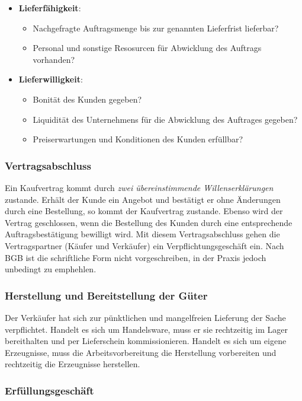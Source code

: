 \documentclass[a4paper, 12pt]{report}
\begin{document}
\begin{multicols}{2}
\begin{itemize}
    \item \textbf{Lieferfähigkeit}:
    \begin{itemize}
	\item Nachgefragte Auftragsmenge bis zur genannten Lieferfrist
	    lieferbar?
	\item Personal und sonstige Resosurcen für Abwicklung des Auftrags
	    vorhanden?
    \end{itemize}
    \item \textbf{Lieferwilligkeit}:
    \begin{itemize}
	\item Bonität des Kunden gegeben?
	\item Liquidität des Unternehmens für die Abwicklung des Auftrages
	    gegeben?
	\item Preiserwartungen und Konditionen des Kunden erfüllbar?
    \end{itemize}
\end{itemize}

\subsubsection{Vertragsabschluss}

Ein Kaufvertrag kommt durch \emph{zwei übereinstimmende Willenserklärungen}
zustande. Erhält der Kunde ein Angebot und bestätigt er ohne Änderungen durch
eine Bestellung, so kommt der Kaufvertrag zustande. Ebenso wird der Vertrag
geschlossen, wenn die Bestellung des Kunden durch eine entsprechende
Auftragsbestätigung bewilligt wird. Mit diesem Vertragsabschluss gehen die
Vertragspartner (Käufer und Verkäufer) ein Verpflichtungsgeschäft ein. Nach BGB
ist die schriftliche Form nicht vorgeschreiben, in der Praxis jedoch unbedingt
zu emphehlen.

\subsubsection{Herstellung und Bereitstellung der Güter}

Der Verkäufer hat sich zur pünktlichen und mangelfreien Lieferung der Sache
verpflichtet. Handelt es sich um Handelsware, muss er sie rechtzeitig im Lager
bereithalten und per Lieferschein kommissionieren. Handelt es sich um eigene
Erzeugnisse, muss die Arbeitsvorbereitung die Herstellung vorbereiten und
rechtzeitig die Erzeugnisse herstellen.

\subsubsection{Erfüllungsgeschäft}


\end{multicols}
\end{document}
